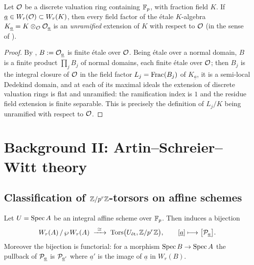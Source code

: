 \documentclass[11pt]{article}
\newcommand{\wv}[1]{\underline{#1}}                 %
\begin{document}
\begin{cor}\label{cor:integral-unramified}
Let $\mathcal{O}$ be a discrete valuation ring containing $\mathbb{F}_p$, with fraction
field $K$.  If $\wv a\in W_r(\Oo)\subset W_r(K)$, then every field factor
of the \'etale $K$-algebra $K_{\wv a}=K\otimes_\Oo\Oo_{\wv a}$ is an
\emph{unramified} extension of $K$ with respect to $\mathcal{O}$ (in the sense of
).
\end{cor}

\begin{proof}
By , $B:=\Oo_{\wv a}$ is finite \'etale over $\mathcal{O}$.  Being
\'etale over a normal domain, $B$ is a finite product $\prod_j B_j$ of
normal domains, each finite \'etale over $\mathcal{O}$; then
$B_j$ is the integral closure of $\mathcal{O}$ in the field factor
$L_j=\operatorname{Frac}(B_j)$ of $K_{\wv a}$, it is a semi-local Dedekind domain, and at
each of its maximal ideals the extension of discrete valuation rings is
flat and unramified: the ramification index is $1$ and the residue field
extension is finite separable.  This is precisely the definition of
$L_j/K$ being unramified with respect to $\mathcal{O}$.
\end{proof}

\section{Background II: Artin--Schreier--Witt theory}\label{sec:asw}

\subsection{Classification of \texorpdfstring{$\mathbb{Z}/p^r\mathbb{Z}$}{Z/p\^{}r}-torsors on affine schemes}

\begin{prop}\label{prop:classification}
Let $U=\operatorname{Spec} A$ be an integral affine scheme over $\mathbb{F}_p$.  Then
 induces a bijection
\[
W_r(A)\,/\,\wp\,W_r(A)\;\xrightarrow{\ \cong\ }\;
\mathrm{Tors}\big(U_{\text{\'et}},\Z/p^r\Z\big),\qquad
[\wv a]\longmapsto\big[\cP_{\wv a}\big].
\]
Moreover the bijection is functorial: for a morphism
$\operatorname{Spec} B\to\operatorname{Spec} A$ the pullback of $\cP_{\wv a}$ is
$\cP_{\wv a'}$ where $\wv a'$ is the image of $\wv a$ in $W_r(B)$.
\end{prop}
\end{document}
